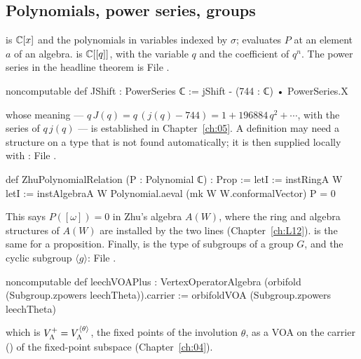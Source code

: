 \subsection{Polynomials, power series, groups}\label{ch01:sec:algebra}

 is ${\mathbb{C}}[x]$ and  the polynomials in variables indexed by
$\sigma$;  evaluates $P$ at an element $a$ of an algebra.
 is ${\mathbb{C}}[[q]]$, with  the variable $q$ and
 the coefficient of $q^n$. The power series in the headline theorem is
\noindent File .
\begin{leancode}
noncomputable def JShift : PowerSeries ℂ := jShift - (744 : ℂ) • PowerSeries.X
\end{leancode}
whose meaning --- $q\,J(q) = q\,(j(q)-744) = 1 + 196884\,q^2+\cdots$, with  the series of
$q\,j(q)$ ---
is established in Chapter~\ref{ch:05}. A definition may need a structure on a type that is not
found automatically; it is then supplied locally with :
\noindent File .
\begin{leancode}
def ZhuPolynomialRelation (P : Polynomial ℂ) : Prop :=
  letI := instRingA W
  letI := instAlgebraA W
  Polynomial.aeval (mk W W.conformalVector) P = 0
\end{leancode}
This says $P([\omega]) = 0$ in Zhu's algebra $A(W)$, where the ring and algebra structures of $A(W)$
are installed by the two  lines (Chapter~\ref{ch:L12}).  is the same for a
proposition. Finally,  is the type of subgroups of a group $G$, and
 the cyclic subgroup $\langle g\rangle$:
\noindent File .
\begin{leancode}
noncomputable def leechVOAPlus :
    VertexOperatorAlgebra (orbifold (Subgroup.zpowers leechTheta)).carrier :=
  orbifoldVOA (Subgroup.zpowers leechTheta)
\end{leancode}
which is $V_{\Lambda}^+ = V_{\Lambda}^{\langle\theta\rangle}$, the fixed points of the involution $\theta$,
as a VOA on the carrier () of the fixed-point subspace (Chapter~\ref{ch:04}).


